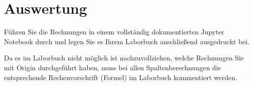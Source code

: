 \documentclass{../papanleitung}
\begin{document}
\section{Auswertung}

\begin{usingpython}
Führen Sie die Rechnungen in einem vollständig dokumentierten Jupyter Notebook durch und legen Sie es Ihrem Laborbuch anschließend ausgedruckt bei.
\end{usingpython}

\begin{usingorigin}
Da es im Laborbuch nicht m\"{o}glich ist nachzuvollziehen, welche Rechnungen Sie mit Origin durchgef\"{u}hrt haben, muss bei allen Spaltenberechnungen die entsprechende Rechenvorschrift (Formel) im Laborbuch kommentiert werden.
\end{usingorigin}
\end{document}
